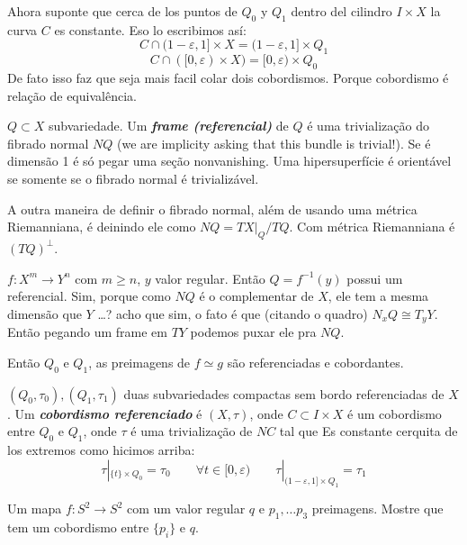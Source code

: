 Ahora suponte que cerca de los puntos de \(Q_0\) y \(Q_1\) dentro del cilindro \(I\times X\) la curva \(C\) es constante. Eso lo escribimos así:
\[C \cap (1- \varepsilon , 1] \times X= (1-\varepsilon,1] \times Q_1\]
\[C \cap([0,\varepsilon) \times X)=[0,\varepsilon) \times Q_0\]
De fato isso faz que seja mais facil colar dois cobordismos. Porque cobordismo é relação de equivalência.

\begin{defn}\leavevmode
\(Q \subset X\) subvariedade. Um \textit{\textbf{frame (referencial)}} de \(Q\) é uma trivialização do fibrado normal \(NQ\) {\color{6}(we are implicity asking that this bundle is trivial!)}. Se é dimensão 1 é só pegar uma seção nonvanishing. Uma hipersuperfície é orientável se somente se o fibrado normal é trivializável.
\end{defn}

\begin{remark}\leavevmode
A outra maneira de definir o fibrado normal, além de usando uma métrica Riemanniana, é deinindo ele como \(NQ= TX|_{Q}/TQ\). Com métrica Riemanniana é \((TQ)^\perp\).
\end{remark}

\begin{remark}\leavevmode
\(f: X^m \to Y^n\) com \(m \geq n\), \(y\) valor regular. Então \(Q=f^{-1}(y)\) possui um referencial. Sim, porque como \(NQ\) é o complementar de \(X\), ele tem a mesma dimensão que \(Y\) …? acho que sim, o fato é que (citando o quadro) \(N_xQ \cong T_y Y\). Então pegando um frame em \(TY\) podemos puxar ele pra \(NQ\).
\end{remark}

Então \(Q_0\) e \(Q_1\), as preimagens de \(f \simeq g\) são referenciadas e cobordantes.

\begin{defn}\leavevmode
\((Q_0,\tau_0),(Q_1,\tau_1)\) duas subvariedades compactas sem bordo referenciadas de \(X\). Um \textit{\textbf{cobordismo referenciado}} é \((X,\tau)\), onde \(C \subset I\times X\) é um cobordismo entre \(Q_0\) e \(Q_1\), onde \(\tau\) é uma trivialização de \(NC\) tal que {\color{7}Es constante cerquita de los extremos como hicimos arriba}:
\[\tau |_{\{t\}\times Q_0}=\tau_0\qquad \forall t \in [0,\varepsilon)\qquad \tau|_{(1-\varepsilon,1] \times Q_1}=\tau_1\]
\end{defn}

\begin{example}\leavevmode
	Um mapa \(f: S^2 \to S^2\) com um valor regular \(q\) e \(p_1,\ldots p_3\) preimagens. Mostre que tem um cobordismo entre \(\{ p_i\}\) e \(q\).
\end{example}

